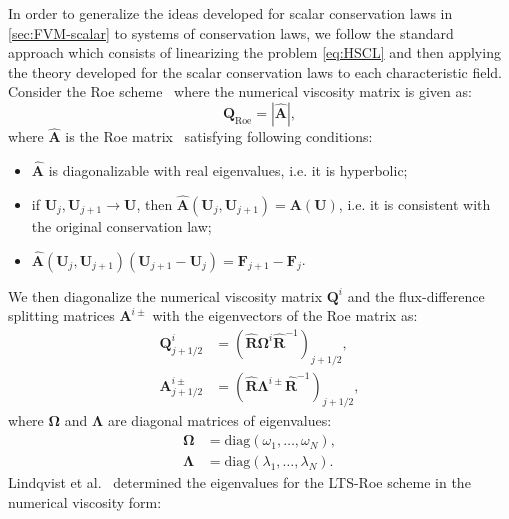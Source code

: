 In order to generalize the ideas developed for scalar conservation laws in \cref{sec:FVM-scalar} to systems of conservation laws, we follow the standard approach which consists of linearizing the problem \eqref{eq:HSCL} and then applying the theory developed for the scalar conservation laws to each characteristic field. Consider the Roe scheme~\cite{roe81} where the numerical viscosity matrix is given as:
\begin{equation}
\mathbf{Q}_\text{Roe} = | \hat{\mathbf{A}} |,
\end{equation}
where $ \hat{\mathbf{A}} $ is the Roe matrix~\cite{roe81} satisfying following conditions:
\begin{itemize}
\item $ \hat{\mathbf{A}} $ is diagonalizable with real eigenvalues, i.e. it is hyperbolic;
\item if $ \mathbf{U}_j, \mathbf{U}_{j+1} \rightarrow \mathbf{U} $, then $ \hat{\mathbf{A}} \left( \mathbf{U}_j, \mathbf{U}_{j+1} \right) = \mathbf{A} \left( \mathbf{U} \right) $, i.e. it is consistent with the original conservation law;
\item $ \hat{\mathbf{A}} \left( \mathbf{U}_j, \mathbf{U}_{j+1} \right) \left( \mathbf{U}_{j+1} - \mathbf{U}_j \right) = \mathbf{F}_{j+1} - \mathbf{F}_j $.
\end{itemize}
We then diagonalize the numerical viscosity matrix $ \mathbf{Q}^i $ and the flux-difference splitting matrices $ \mathbf{A}^{i \pm} $ with the eigenvectors of the Roe matrix as:
\begin{subequations}
\begin{align}
\mathbf{Q}_{j+1/2}^i & = \left( \hat{\mathbf{R}} \mathbf{\Omega}^i \hat{\mathbf{R}}^{-1} \right)_{j+1/2}, \label{eq:system-LTS-Q} \\
\mathbf{A}_{j+1/2}^{i\pm} & = \left( \hat{\mathbf{R}} \mathbf{\Lambda}^{i\pm} \hat{\mathbf{R}}^{-1} \right)_{j+1/2}, \label{eq:system-LTS-A}
\end{align}
\end{subequations}
where $ \mathbf{\Omega} $ and $ \mathbf{\Lambda} $ are diagonal matrices of eigenvalues:
\begin{subequations}
\begin{align}
\mathbf{\Omega} & = \text{diag} \left( \omega_1, \dots, \omega_N \right), \\
\mathbf{\Lambda} & = \text{diag} \left( \lambda_1, \dots, \lambda_N \right).
\end{align}
\end{subequations}
Lindqvist et al.~\cite{lin16} determined the eigenvalues for the LTS-Roe scheme in the numerical viscosity form:
